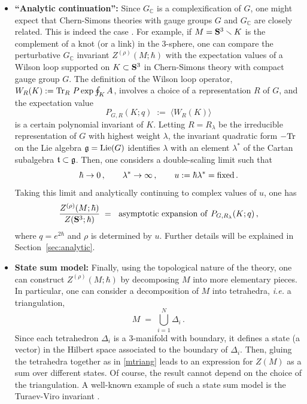 \documentclass[hyper]{JHEP3}
\def\Tr{{\rm Tr}}
\newcommand{\C}{{\mathbb{C}}}
\newcommand\be{\begin{equation}}
\newcommand\ee{\end{equation}}
\def\={\;=\;}
\def\sm{\smallsetminus}
\begin{document}
\begin{itemize}
\item {\bf ``Analytic continuation'':}
Since $G_{\C}$ is a complexification of $G$, one might expect that
Chern-Simons theories with gauge groups $G$ and $G_{\C}$ are closely related.
This is indeed the case \cite{gukov-2003}.
For example, if $M = {\bf S}^3 \sm K$ is the complement of a knot (or a link)
in the 3-sphere, one can compare the perturbative $G_{\C}$ invariant $Z^{(\rho)} (M;\hbar)$
with the expectation values of a Wilson loop supported on $K \subset {\bf S}^3$
in Chern-Simons theory with compact gauge group $G$.
The definition of the Wilson loop operator, $W_R (K) := \Tr_{R} ~P \exp \oint_{K} A$,
involves a choice of a representation $R$ of $G$,
and the expectation value
  \be \label{wilsonp} P_{G,R} (K;q) \;:= \;\langle W_R (K) \rangle  \ee
is a certain polynomial invariant of $K$.
Letting $R = R_{\lambda}$ be the irreducible representation of $G$
with highest weight $\lambda$, the invariant quadratic form $- \Tr$
on the Lie algebra $\frak g = {\rm Lie} (G)$ identifies $\lambda$
with an element $\lambda^*$ of the Cartan subalgebra $\frak t \subset \frak g$.
Then, one considers a double-scaling limit
such that
\be
\hbar \to 0\,, \qquad
\lambda^* \to \infty\,, \qquad
u := \hbar \lambda^* = {\rm fixed}\,.
\label{dslimit}
\ee
Taking this limit and analytically continuing to complex values of $u$,
one has \cite{gukov-2003}
\be
\frac{Z^{(\rho)}(M;\hbar)}{Z({\bf S}^3;\hbar)}
\= {\rm ~asymptotic~expansion~of~} P_{G,R_{\lambda}} (K;q)\,,
\label{zviap}
\ee
where $q = e^{2 \hbar}$ and $\rho$ is determined by $u$.
Further details will be explained in Section~\ref{sec:analytic}.

\item {\bf State sum model:}
Finally, using the topological nature of the theory, one can construct
$Z^{(\rho)} (M;\hbar)$ by decomposing $M$ into more elementary pieces.
In particular, one can consider a decomposition of $M$ into tetrahedra,
{\it i.e.} a triangulation,
\be M \= \bigcup_{i=1}^N \Delta_i\,.
\label{mtriang}
\ee
Since each tetrahedron $\Delta_i$ is a 3-manifold with boundary,
it defines a state (a vector) in the Hilbert space associated
to the boundary of $\Delta_i$.
Then, gluing the tetrahedra together as in \eqref{mtriang}
leads to an expression for $Z(M)$ as a sum over different states.
Of course, the result cannot depend on the choice of the triangulation.
A well-known example of such a state sum model
is the Turaev-Viro invariant \cite{turaev-1992}.


\end{itemize}
\end{document}
